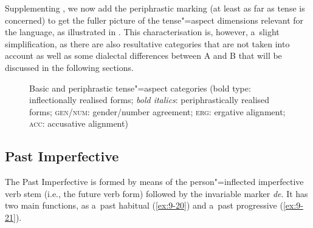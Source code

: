 Supplementing , we now add the periphrastic marking (at least as far as tense is concerned) to get the fuller picture of the tense"=aspect dimensions relevant for the language, as illustrated in . This characterisation is, however, a~slight simplification, as there are also resultative categories that are not taken into account as well as some dialectal differences between A and B that will be discussed in the following sections.


\begin{figure}[ht]
\centering
{}
\caption{Basic and periphrastic tense"=aspect categories (bold type: inflectionally realised forms;
  \textit{bold italics}: periphrastically realised forms; \textsc{gen/num}: gender/number agreement;
  \textsc{erg}: ergative alignment; \textsc{acc}: accusative alignment)\label{fig:9-2}}
\end{figure}

\subsection{Past Imperfective}
\label{subsec:9-1-6}

The Past Imperfective is formed by means of the person"=inflected imperfective verb stem (i.e., the future verb form) followed by the invariable marker \textit{de}. It has two main functions, as a~past habitual (\ref{ex:9-20}) and a~past progressive (\ref{ex:9-21}).

